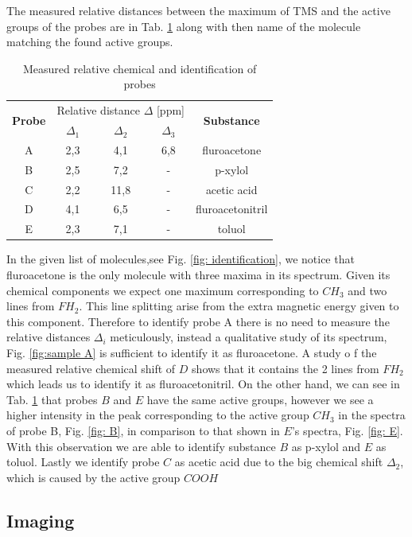 The measured relative distances between the maximum of  TMS and the active groups of the probes are in Tab. \ref{tab: identification} along with then name of the molecule matching the found active groups.
\begin{table}[!htbp]
 \begin{center}
  \caption{ Measured relative chemical and identification of probes}
  \label{tab: identification}
  \begin{tabular}{|c||c|c|c|c|}
  \hline
 	\multirow{2}{*}{\textbf{Probe}} & \multicolumn{3}{c}{Relative distance $\Delta$ [ppm]} &\multirow{2}{*}{ \textbf{Substance}} \\
								   &	 $\Delta_1$ & $\Delta_2$ &  $\Delta_3$ & \\
\hline
\hline
 	A & 2,3 & 4,1 & 6,8& fluroacetone \\
 	B & 2,5 & 7,2 & - & p-xylol \\
 	C & 2,2 & 11,8& - & acetic acid \\
 	D & 4,1 & 6,5 & - & fluroacetonitril \\
 	E & 2,3 & 7,1 & - & toluol \\
 	\hline
  \end{tabular}
 \end{center}
\end{table}
In the given list of molecules,see Fig. \ref{fig: identification}, we notice that fluroacetone is the only molecule with three maxima in its spectrum. Given its chemical components we expect one maximum corresponding to $CH_3$ and two lines from $FH_2$. This line splitting arise from the extra magnetic energy given to this component. Therefore to identify probe A there is no need to measure the relative distances $\Delta_i$ meticulously, instead a qualitative study of its spectrum, Fig. \ref{fig:sample A} is sufficient to identify it as fluroacetone. 
A study o f the measured relative chemical shift of $D$ shows that it contains the 2 lines from $FH_2$ which leads us to identify it as fluroacetonitril.  
On the other hand, we can see in Tab. \ref{tab: identification} that probes $B$ and $E$ have the same active groups, however we see a higher intensity in the peak corresponding to the active group $CH_3$ in the spectra of probe B, Fig. \ref{fig: B}, in comparison to that shown in $E$'s spectra, Fig. \ref{fig: E}. With this observation we are able to identify substance $B$ as p-xylol and $E$ as toluol. 
Lastly we identify probe $C$ as acetic acid due to the big chemical shift $\Delta_2$, which is caused by the active group $COOH$
\subsection{Imaging}

